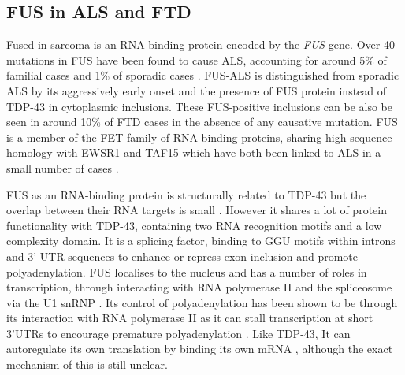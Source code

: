 %
%
%
%
%






\subsection{FUS in ALS and FTD}
Fused in sarcoma is an RNA-binding protein encoded by the \textit{FUS} gene. Over 40 mutations in FUS have been found to cause ALS, accounting for around 5\% of familial cases and 1\% of sporadic cases \citep{Vance2009-ye,Tan07102016}. FUS-ALS is distinguished from sporadic ALS by its aggressively early onset and the presence of FUS protein instead of TDP-43 in cytoplasmic inclusions. These FUS-positive inclusions can be also be seen in around 10\% of FTD cases \citep{Neumann2009} in the absence of any causative mutation. FUS is a member of the FET family of RNA binding proteins, sharing high sequence homology with EWSR1 and TAF15 \citep{Kovar2011} which have both been linked to ALS in a small number of cases \citep{Neumann2011, Couthouis2011,Ticozzi2011-bs,Couthouis2012}.

FUS as an RNA-binding protein is structurally related to TDP-43 but the overlap between their RNA targets is small \citep{Lagier-Tourenne2012-wa,Rogelj2012,Colombrita2012, Honda2014}. However it shares a lot of protein functionality with TDP-43, containing two RNA recognition motifs and a low complexity domain. It is a splicing factor, binding to GGU motifs within introns and 3' UTR sequences \citep{Rogelj2012,Lagier-Tourenne2012-wa} to enhance or repress exon inclusion and promote polyadenylation. FUS localises to the nucleus and has a number of roles in transcription, through interacting with RNA polymerase II and the spliceosome via the U1 snRNP \citep{Sun2015a, Yu2015}. Its control of polyadenylation has been shown to be through its interaction with RNA polymerase II as it can stall transcription at short 3'UTRs to encourage premature polyadenylation \citep{Masuda2015}. Like TDP-43, It can autoregulate its own translation by binding its own mRNA \citep{Zhou2013}, although the exact mechanism of this is still unclear.

